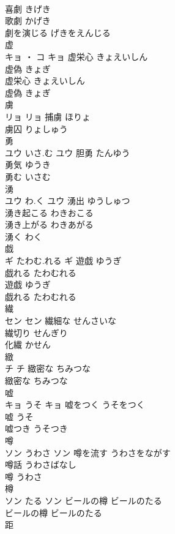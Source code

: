 \documentclass[8pt]{extreport}
\begin{document}
\begin{CJK}{UTF8}{min}
\\	喜劇	きげき	
\\	歌劇	かげき	
\\	劇を演じる	げきをえんじる	
\\	虚	
\\	キョ ・ コ		キョ	虚栄心	きょえいしん	
\\	虚偽	きょぎ	
\\	虚栄心	きょえいしん	
\\	虚偽	きょぎ	
\\	虜	
\\	リョ		リョ	捕虜	ほりょ	
\\	虜囚	りょしゅう	
\\	勇	
\\	ユウ	いさ.む	ユウ	胆勇	たんゆう	
\\	勇気	ゆうき	
\\	勇む	いさむ	
\\	湧	
\\	ユウ	わ.く	ユウ	湧出	ゆうしゅつ	
\\	湧き起こる	わきおこる	
\\	湧き上がる	わきあがる	
\\	湧く	わく	
\\	戯	
\\	ギ	たわむ.れる	ギ	遊戯	ゆうぎ	
\\	戯れる	たわむれる	
\\	遊戯	ゆうぎ	
\\	戯れる	たわむれる	
\\	繊	
\\	セン		セン	繊細な	せんさいな	
\\	繊切り	せんぎり	
\\	化繊	かせん	
\\	緻	
\\	チ		チ	緻密な	ちみつな	
\\	緻密な	ちみつな	
\\	嘘	
\\	キョ	うそ	キョ	嘘をつく	うそをつく	
\\	嘘	うそ	
\\	嘘つき	うそつき	
\\	噂	
\\	ソン	うわさ	ソン	噂を流す	うわさをながす	
\\	噂話	うわさばなし	
\\	噂	うわさ	
\\	樽	
\\	ソン	たる	ソン	ビールの樽	ビールのたる	
\\	ビールの樽	ビールのたる	
\\	距	

\end{CJK}
\end{document}
